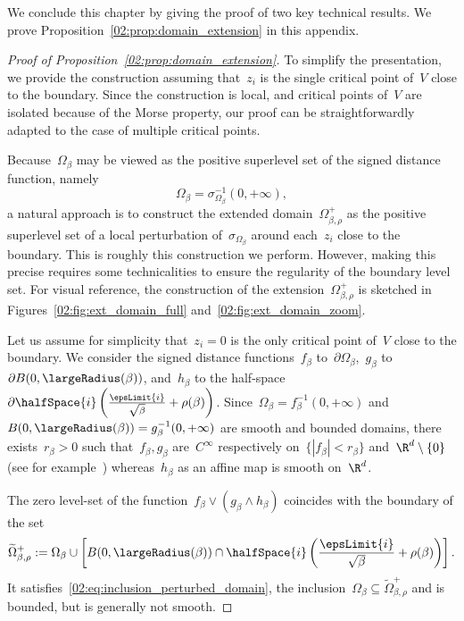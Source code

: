     We conclude this chapter by giving the proof of two key technical results.
    \label{02:sec:proof_domain_extension}
    We prove Proposition~\ref{02:prop:domain_extension} in this appendix.
    \begin{proof}[Proof of Proposition~\ref{02:prop:domain_extension}]
        To simplify the presentation, we provide the construction assuming that~$z_i$ is the single critical point of~$V$ close to the boundary. Since the construction is local, and critical points of~$V$ are isolated because of the Morse property, our proof can be straightforwardly adapted to the case of multiple critical points.
        
        Because~$\Omega_\beta$ may be viewed as the positive superlevel set of the signed distance function, namely
        \[\Omega_\beta = \sigma_{\Omega_\beta}^{-1}(0,+\infty),\]
        a natural approach is to construct the extended domain~$\Omega_{\beta,\rho}^+$ as the positive superlevel set of a local perturbation of~$\sigma_{\Omega_\beta}$ around each~$z_i$ close to the boundary.
        This is roughly this construction we perform. However, making this precise requires some technicalities to ensure the regularity of the boundary level set.
        For visual reference, the construction of the extension~$\Omega_{\beta,\rho}^+$ is sketched in Figures~\ref{02:fig:ext_domain_full} and~\ref{02:fig:ext_domain_zoom}.

        Let us assume for simplicity that~$z_i=0$ is the only critical point of~$V$ close to the boundary.
        We consider the signed distance functions~$f_\beta$ to~$\partial\Omega_\beta$,~$g_\beta$ to~$\partial B(0,\largeRadius(\beta))$, and~$h_\beta$ to the half-space~$\partial \halfSpace{i}\left(\frac{\epsLimit{i}}{\sqrt\beta}+ \rho(\beta)\right)$.
        Since~$\Omega_\beta = f_\beta^{-1}(0,+\infty)$ and $B(0,\largeRadius(\beta))=g_\beta^{-1}(0,+\infty)$ are smooth and bounded domains, there exists~$r_\beta>0$ such that~$f_\beta,g_\beta$ are~$C^\infty$ respectively on~$\{|f_\beta|<r_\beta\}$ and~$\R^d\setminus\{0\}$ (see for example~\cite[Lemma 14.16]{GT01}) whereas~$h_\beta$ as an affine map is smooth on~$\R^d$.
        
        The zero level-set of the function~$f_\beta\lor(g_\beta\land h_\beta)$ coincides with the boundary of the set
        $$\widetilde{\Omega}_{\beta,\rho}^+ :=\Omega_\beta \cup \left[ B(0,\largeRadius(\beta))\cap \halfSpace{i}\left(\frac{\epsLimit{i}}{\sqrt\beta}+ \rho(\beta)\right)\right].$$
        It satisfies~\eqref{02:eq:inclusion_perturbed_domain}, the inclusion~$\Omega_\beta\subseteq \widetilde{\Omega}_{\beta,\rho}^+$ and is bounded, but is generally not smooth.


\end{proof}
